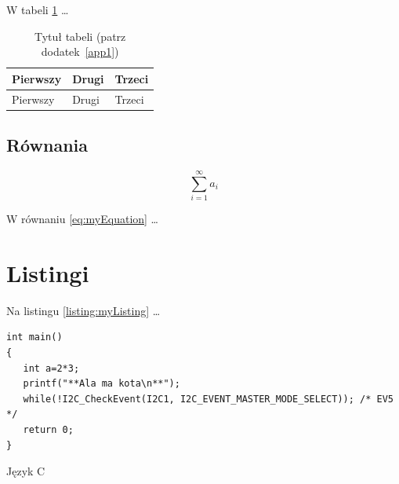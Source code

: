 W tabeli \ref{table:table1} \dots

\begin{table}
	\centering\caption{Tytuł tabeli (patrz dodatek~\ref{app1}) \label{table:table1}}
	\begin{tabular}{|l|l|l|}%
		\hline
		Pierwszy & Drugi & Trzeci \\
		\hline
		Pierwszy & Drugi & Trzeci \\
		\hline
	\end{tabular}
\end{table}

\subsection{Równania}

\begin{equation}
	\sum_{i=1}^{\infty}a_i
	\label{eq:myEquation}
\end{equation}

W równaniu \ref{eq:myEquation} \dots

\section{Listingi}

Na listingu \ref{listing:myListing} \dots

\begin{listing}
	\begin{verbatim}  
int main()
{
   int a=2*3;
   printf("**Ala ma kota\n**");
   while(!I2C_CheckEvent(I2C1, I2C_EVENT_MASTER_MODE_SELECT)); /* EV5 */
   return 0;
}
\end{verbatim}
	\caption{Język C} \label{listing:myListing}
\end{listing}

